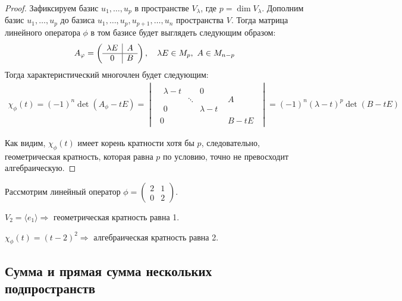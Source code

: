 \begin{proof}
	Зафиксируем базис $u_1, \ldots, u_p$ в пространстве $V_\lambda$, где $p = \dim{V_\lambda}$. Дополним базис $u_1, \ldots, u_p$ до базиса $u_1, \ldots, u_p, u_{p+1}, \ldots, u_n$ пространства $V$. Тогда матрица линейного оператора $\phi$ в 
	том базисе будет выглядеть следующим образом:
	\begin{gather*}
	A_\phi = 
		\begin{pmatrix*}
		\begin{array}{c|c}
		\l E & A \\ \hline
		0 & B
		\end{array}
		\end{pmatrix*}, \quad \lambda E \in M_p,\ A \in M_{n-p}
	\end{gather*}
	Тогда характеристический многочлен будет следующим:
	\begin{gather*}
	\chi_\phi(t) = (-1)^n \det (A_\phi - tE) = 
	\begin{vmatrix}
	\begin{array}{c|c}
	\begin{matrix}
	\lambda - t &  & 0 \\
	& \ddots &  \\
	0 &  & \lambda - t
	\end{matrix}
	& A \\ \hline
	0 & B - tE
	\end{array}
	\end{vmatrix}
	= (-1)^n(\lambda - t)^p\det(B - tE)
	\end{gather*}

	Как видим, $\chi_\phi(t)$ имеет корень кратности хотя бы $p$, следовательно, геометрическая кратность, которая равна $p$ по условию, точно не превосходит алгебраическую.
\end{proof}

\begin{Examples} Рассмотрим линейный оператор $\phi = \begin{pmatrix}
    2& 1 \\
    0& 2
    \end{pmatrix}$.

    $V_2 = \langle e_1\rangle \Rightarrow$ геометрическая кратность равна 1.

    $\chi_\phi(t) = (t-2)^2 \Rightarrow$ алгебраическая кратность равна 2.
\end{Examples}

\subsection*{Сумма и прямая сумма нескольких подпространств}

